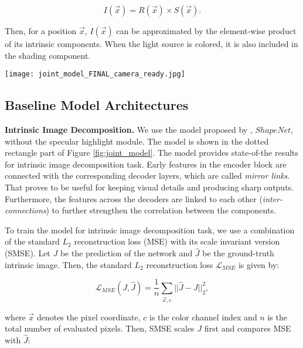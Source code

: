 \documentclass[runningheads]{llncs}
\begin{document}
\begin{equation} \label{eq:iid}
I(\vec{x}) = R(\vec{x}) \times S(\vec{x}) .
\end{equation}

\noindent Then, for a position $\vec{x}$, $I(\vec{x})$ can be approximated by the element-wise product of its intrinsic components. When the light source is colored, it is also  included in the shading component.

\begin{figure*}[t]
\texttt{[image: joint\_model\_FINAL\_camera\_ready.jpg]}
\centering
\caption{Model architecture for jointly solving intrinsic image decomposition and semantic segmentation with one shared encoder and three separate decoders:  one for shading, one
for reflectance, and one for semantic segmentation prediction. The part in the dotted rectangle denotes the baseline ShapeNet model of \cite{shi}.}
\label{fig:joint_model}
\end{figure*}

\subsection{Baseline Model Architectures}
\textbf{Intrinsic Image Decomposition.}  We use the model proposed by \cite{shi}, $ShapeNet$, without the specular highlight module. The model is shown in the dotted rectangle part of Figure \ref{fig:joint_model}. The model provides state-of-the results for intrinsic image decomposition task. Early features in the encoder block are connected with the corresponding decoder layers, which are called \textit{mirror links}. That proves to be useful for keeping visual details and producing sharp outputs. Furthermore, the features across the decoders are linked to each other (\textit{inter-connections}) to further strengthen the correlation between the components.

To train the model for intrinsic image decomposition task, we use a combination of the standard $L_2$ reconstruction loss (MSE) with its scale invariant version (SMSE). Let $J$ be the prediction of the network and $\hat{J}$ be the ground-truth intrinsic image. Then, the standard $L_2$ reconstruction loss $\mathcal{L}_{MSE}$ is given by:

\begin{equation} \label{eq:MSE}
\mathcal{L}_{MSE}(J, \hat{J}) = \frac{1}{n} \sum_{\vec{x},c}^{} ||\hat{J} - J||^{2}_{2},
\end{equation}

\noindent where $\vec{x}$ denotes the pixel coordinate, $c$ is the color channel index and $n$ is the total number of evaluated pixels. Then, SMSE scales $J$ first and compares MSE with $\hat{J}$:
\end{document}
